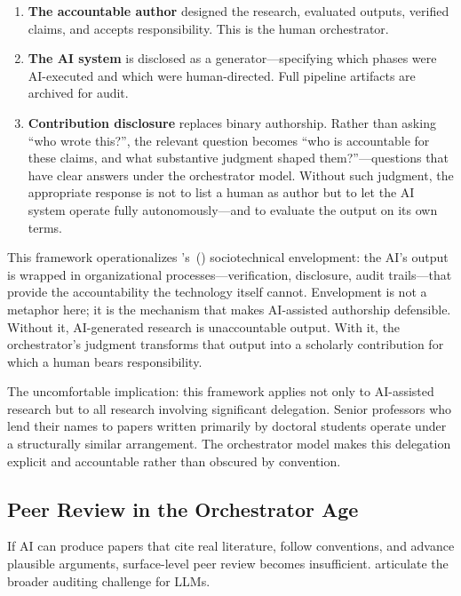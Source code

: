 \documentclass{article}
\begin{document}
\begin{enumerate}
  \item \textbf{The accountable author} designed the research, evaluated outputs, verified claims, and accepts responsibility. This is the human orchestrator.
  \item \textbf{The AI system} is disclosed as a generator---specifying which phases were AI-executed and which were human-directed. Full pipeline artifacts are archived for audit.
  \item \textbf{Contribution disclosure} replaces binary authorship. Rather than asking ``who wrote this?'', the relevant question becomes ``who is accountable for these claims, and what substantive judgment shaped them?''---questions that have clear answers under the orchestrator model. Without such judgment, the appropriate response is not to list a human as author but to let the AI system operate fully autonomously---and to evaluate the output on its own terms.
\end{enumerate}

This framework operationalizes \citeauthor{asatiani2021envelopment}'s~(\citeyear{asatiani2021envelopment}) sociotechnical envelopment: the AI's output is wrapped in organizational processes---verification, disclosure, audit trails---that provide the accountability the technology itself cannot. Envelopment is not a metaphor here; it is the mechanism that makes AI-assisted authorship defensible. Without it, AI-generated research is unaccountable output. With it, the orchestrator's judgment transforms that output into a scholarly contribution for which a human bears responsibility.

The uncomfortable implication: this framework applies not only to AI-assisted research but to all research involving significant delegation. Senior professors who lend their names to papers written primarily by doctoral students operate under a structurally similar arrangement. The orchestrator model makes this delegation explicit and accountable rather than obscured by convention.


\subsection{Peer Review in the Orchestrator Age}

If AI can produce papers that cite real literature, follow conventions, and advance plausible arguments, surface-level peer review becomes insufficient. \citet{mokander2023auditing} articulate the broader auditing challenge for LLMs.
\end{document}
